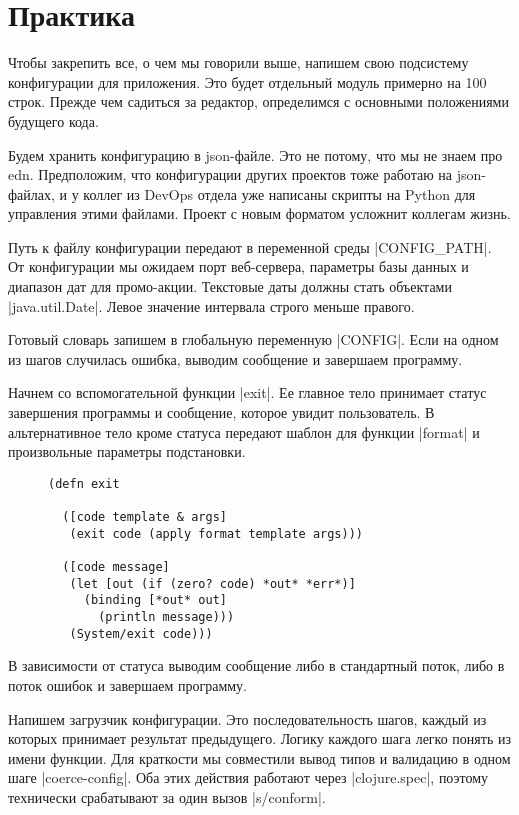 \section{Практика}

Чтобы закрепить все, о чем мы говорили выше, напишем свою подсистему
конфигурации для приложения. Это будет отдельный модуль примерно на 100
строк. Прежде чем садиться за редактор, определимся с основными положениями
будущего кода.

Будем хранить конфигурацию в json-файле. Это не потому, что мы не знаем про
edn. Предположим, что конфигурации других проектов тоже работаю на json-файлах,
и у коллег из DevOps отдела уже написаны скрипты на Python для управления этими
файлами. Проект с новым форматом усложнит коллегам жизнь.

Путь к файлу конфигурации передают в переменной среды \spverb|CONFIG_PATH|. От
конфигурации мы ожидаем порт веб-сервера, параметры базы данных и диапазон дат
для промо-акции. Текстовые даты должны стать объектами \spverb|java.util.Date|. Левое
значение интервала строго меньше правого.

Готовый словарь запишем в глобальную переменную \spverb|CONFIG|. Если на одном из шагов
случилась ошибка, выводим сообщение и завершаем программу.

Начнем со вспомогательной функции \spverb|exit|. Ее главное тело принимает статус
завершения программы и сообщение, которое увидит пользователь. В альтернативное
тело кроме статуса передают шаблон для функции \spverb|format| и произвольные параметры
подстановки.

\begin{figure}[!ht]
\begin{verbatim}
(defn exit

  ([code template & args]
   (exit code (apply format template args)))

  ([code message]
   (let [out (if (zero? code) *out* *err*)]
     (binding [*out* out]
       (println message)))
   (System/exit code)))
\end{verbatim}
\end{figure}

В зависимости от статуса выводим сообщение либо в стандартный поток, либо в
поток ошибок и завершаем программу.

Напишем загрузчик конфигурации. Это последовательность шагов, каждый из которых
принимает результат предыдущего. Логику каждого шага легко понять из имени
функции. Для краткости мы совместили вывод типов и валидацию в одном шаге
\spverb|coerce-config|. Оба этих действия работают через \spverb|clojure.spec|, поэтому
технически срабатывают за один вызов \spverb|s/conform|.

